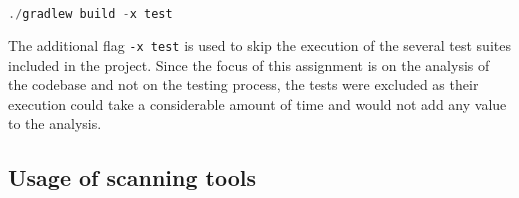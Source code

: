 \begin{lstlisting}[language=C++, caption=Building the project]
                    ./gradlew build -x test
\end{lstlisting}

The additional flag \texttt{-x test} is used to skip the execution of the several test suites included in the project. Since the focus of this assignment is on the analysis of the codebase and not on the testing process, the tests were excluded as their execution could take a considerable amount of time and would not add any value to the analysis.

\subsection{Usage of scanning tools}


